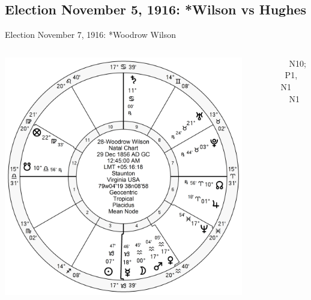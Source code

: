 \subsection{Election November 5, 1916: *Wilson vs Hughes}
\begin{frame}[t]{Election November 7, 1916: *Woodrow Wilson}
\small
\begin{columns}[T, onlytextwidth]
\vspace{-1em}
{\includegraphics[width=0.9\textwidth]{charts/Wilson.png}}
\fontsize{7pt}{8pt}\selectfont

\Mercury\, \Opposition\, N10; \Trine\, P1, \Square\, N1 \\
\Moon\, \Trine\, N1



\end{columns}
\end{frame}
